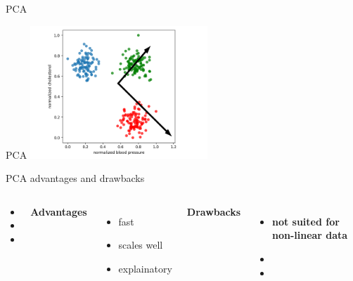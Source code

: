 \documentclass{irdbeamer}
\begin{document}
\begin{frame}{PCA}



\end{frame}

\begin{frame}{PCA}
    \centering
        \includegraphics[width=0.5\textwidth]{./figs/pca3.png}%
\end{frame}



\begin{frame}{PCA advantages and drawbacks}
\begin{columns}
\begin{column}{0.05\textwidth}
\begin{itemize}
    \item[] 
    \item[] 
    \item[] 
\end{itemize}
\end{column}
        \textbf{Advantages}
        \begin{itemize}
            \item<1-> fast
            \item<2-> scales well
            \item<3-> explainatory
        \end{itemize}
        \textbf{Drawbacks}
        \begin{itemize}
            \item<4-> \textbf{not suited for non-linear data}
            \item[] 
            \item[] 
        \end{itemize}
\end{columns}
\end{frame}
\end{document}

